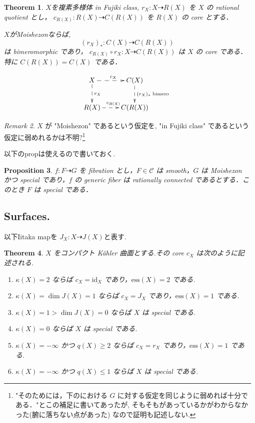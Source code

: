 \documentclass[dvipdfmx,a4paper,11pt]{article} %
\newtheorem{thm}{Theorem}[section]
\newtheorem{prop}[thm]{Proposition}
\theoremstyle{definition}
\theoremstyle{remark}
\newtheorem{rem}[thm]{Remark}
\numberwithin{equation}{section}
\begin{document}
\begin{thm}\cite[Theorem 3.26]{Cam04}
\label{thm-Cam04-3.26}
$X$を複素多様体 in Fujiki class, $r_X : X \dashrightarrow R(X)$ を $X$ の rational quotient とし， $c_{R(X)} : R(X) \dashrightarrow C(R(X))$ を $R(X)$ の core とする．

$X$がMoishezonならば, 
\[
(r_X)_* : C(X) \dashrightarrow C(R(X))
\]
は bimeromorphic であり， $c_{R(X)} \circ r_X : X \dashrightarrow C(R(X))$ は $X$ の core である．
特に $C(R(X)) = C(X)$ である．

\[
\xymatrix{
X\ar@{-->}[d]^{r_X} \ar@{-->}[r]^{c_X}& C(X)  \ar@{-->}[d]^{(r_X)_* \text{ bimero }} \\
R(X)\ar@{-->}[r]^{c_{R(X)}}& C(R(X))  
}
\]

\end{thm}

\begin{rem}\cite[Remark 3.27]{Cam04}
$X$ が "Moishezon" であるという仮定を, "in Fujiki class" であるという仮定に弱めれるかは不明?\footnote{"そのためには，下の\cite[Lem 3.29]{Cam04}における $G$ に対する仮定を同じように弱めれば十分である．"とこの補足に書いてあったが, そもそも\cite[Lem 3.29]{Cam04}があっているかがわからなかった(腑に落ちない点があった) なので証明も記述しない. }
\end{rem}
以下のpropは使えるので書いておく. 
\begin{prop}\cite[Proposition 3.28]{Cam04}
\label{prop-Cam04-3.28}
$f : F \dashrightarrow G$ を fibration とし，$F \in \mathcal{C}$ は smooth，$G$ は Moishezon かつ special であり，$f$ の generic fiber は rationally connected であるとする．このとき $F$ は special である．
\end{prop}

\subsection{Surfaces. \cite[3.5]{Cam04}}
以下Iitaka mapを $J_X : X \dashrightarrow J(X)$と表す. 

\begin{thm}\cite[Theorem 3.31]{Cam04}
\label{thm-Cam04-3.31}
\(X\) をコンパクト Kähler 曲面とする.その core \(c_X\) は次のように記述される.
\begin{enumerate}
\item \(\kappa(X)=2\) ならば \(c_X=\mathrm{id}_X\) であり，\(\mathrm{ess}(X)=2\) である.
\item \(\kappa(X)=\dim J(X)=1\) ならば \(c_X=J_X\) であり，\(\mathrm{ess}(X)=1\) である.
\item \(\kappa(X)=1>\dim J(X) =0\) ならば \(X\) は special である.
\item \(\kappa(X)=0\) ならば \(X\) は special である.
\item \(\kappa(X)=-\infty\) かつ \(q(X)\geq 2\) ならば \(c_X=r_X\) であり，\(\mathrm{ess}(X)=1\) である.
\item \(\kappa(X)=-\infty\) かつ \(q(X)\leq 1\) ならば \(X\) は special である.
\end{enumerate}
\end{thm}
\end{document}
